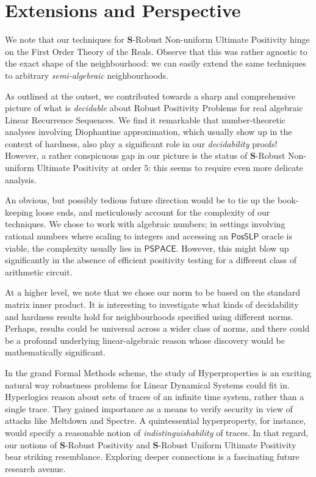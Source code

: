 \section{Extensions and Perspective}
\label{section:perspective}
We note that our techniques for $\mathbf{S}$-Robust Non-uniform Ultimate Positivity hinge on the First Order Theory of the Reals. Observe that this was rather agnostic to the exact shape of the neighbourhood: we can easily extend the same techniques to arbitrary \textit{semi-algebraic} neighbourhoods. 

As outlined at the outset, we contributed towards a sharp and comprehensive picture of what is \textit{decidable} about Robust Positivity Problems for real algebraic Linear Recurrence Sequences. We find it remarkable that number-theoretic analyses involving Diophantine approximation, which usually show up in the context of hardness, also play a significant role in our \textit{decidability} proofs! However, a rather conspicuous gap in our picture is the status of $\mathbf{S}$-Robust Non-uniform Ultimate Positivity at order $5$: this seems to require even more delicate analysis. 

An obvious, but possibly tedious future direction would be to tie up the book-keeping loose ends, and meticulously account for the complexity of our techniques. We chose to work with algebraic numbers; in settings involving rational numbers where scaling to integers and accessing an $\mathsf{PosSLP}$ oracle is viable, the complexity usually lies in $\mathsf{PSPACE}$. However, this might blow up significantly in the absence of efficient positivity testing for a different class of arithmetic circuit.

At a higher level, we note that we chose our norm to be based on the standard matrix inner product. It is interesting to investigate what kinds of decidability and hardness results hold for neighbourhoods specified using different norms. Perhaps, results could be universal across a wider class of norms, and there could be a profound underlying linear-algebraic reason whose discovery would be mathematically significant.

In the grand Formal Methods scheme, the study of Hyperproperties \cite{hyperproperties} is an exciting natural way robustness problems for Linear Dynamical Systems could fit in. Hyperlogics reason about sets of traces of an infinite time system, rather than a single trace. They gained importance as a means to verify security in view of attacks like Meltdown and Spectre. A quintessential hyperproperty, for instance, would specify a reasonable notion of \textit{indistinguishability} of traces. In that regard, our notions of $\mathbf{S}$-Robust Positivity and $\mathbf{S}$-Robust Uniform Ultimate Positivity bear striking resemblance. Exploring deeper connections is a fascinating future research avenue.
